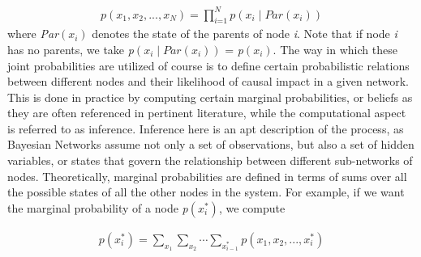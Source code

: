 \documentclass{article}
\begin{document}
\begin{equation} \label{bayesNet}
    \begin{aligned}
        \textit{p}\left(\textit{x$_1$}, \textit{x$_2$},...,\textit{x$_N$} \right) = \prod^\textit{N}_\textit{i=1} \textit{p}\left(\textit{x$_i$}\mid\textit{Par}\left(\textit{x$_i$}\right)\right)
    \end{aligned}
\end{equation} where \textit{Par}$\left(\textit{x}_i\right)$ denotes the state of the parents of node \textit{i}. Note that if node \textit{i} has no parents, we take \textit{p}$\left(\textit{x}_i\mid\textit{Par}\left(\textit{x}_i\right)\right)$ = \textit{p}$\left(\textit{x}_i\right)$. The way in which these joint probabilities are utilized of course is to define certain probabilistic relations between different nodes and their likelihood of causal impact in a given network. This is done in practice by computing certain marginal probabilities, or beliefs as they are often referenced in pertinent literature, while the computational aspect is referred to as inference. Inference here is an apt description of the process, as Bayesian Networks assume not only a set of observations, but also a set of hidden variables, or states that govern the relationship between different sub-networks of nodes. Theoretically, marginal probabilities are defined in terms of sums over all the possible states of all the other nodes in the system. For example, if we want the marginal probability of a node \textit{p}$\left(\textit{x}_i^*\right)$, we compute

\begin{equation} \label{marginalization}
    \begin{aligned}
        \textit{p}\left(\textit{x$_i^{*}$}\right) = \sum_\textit{x$_1$}\sum_\textit{x$_2$} \cdots \sum_\textit{x$_{i-1}^{*}$} \textit{p}\left(\textit{x$_1$}, \textit{x$_2$},...,\textit{x$_i^{*}$} \right)
    \end{aligned}
\end{equation}
\end{document}
